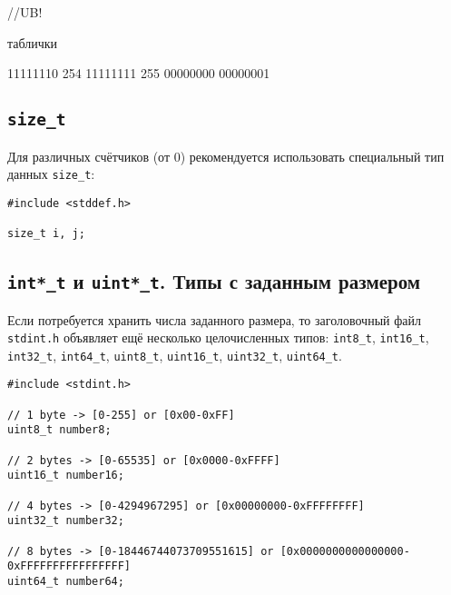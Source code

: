 \documentclass[myc.tex]{subfiles}
\begin{document}
//UB!

таблички

11111110 254
11111111 255
00000000
00000001




\subsection{\texttt{size\_t}}
Для различных счётчиков (от 0) рекомендуется использовать специальный тип данных \texttt{size\_t}:
\begin{lstlisting}
#include <stddef.h>

size_t i, j;
\end{lstlisting}



\subsection{\texttt{int*\_t} и \texttt{uint*\_t}. Типы с заданным размером}
Если потребуется хранить числа заданного размера, то заголовочный файл \texttt{stdint.h} объявляет ещё несколько целочисленных типов:
\texttt{int8\_t}, \texttt{int16\_t}, \texttt{int32\_t}, \texttt{int64\_t},
\texttt{uint8\_t}, \texttt{uint16\_t}, \texttt{uint32\_t}, \texttt{uint64\_t}.

\begin{lstlisting}
#include <stdint.h>

// 1 byte -> [0-255] or [0x00-0xFF]
uint8_t number8;

// 2 bytes -> [0-65535] or [0x0000-0xFFFF]
uint16_t number16;

// 4 bytes -> [0-4294967295] or [0x00000000-0xFFFFFFFF]
uint32_t number32;

// 8 bytes -> [0-18446744073709551615] or [0x0000000000000000-0xFFFFFFFFFFFFFFFF]
uint64_t number64;
\end{lstlisting}
\end{document}
